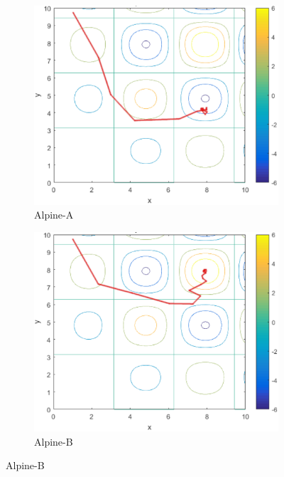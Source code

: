 \documentclass[conference]{IEEEtran}
\begin{document}
% 

\begin{figure}[!t]
\begin{subfigure}{.275\textwidth}
  \centering
  \includegraphics[width=.6\linewidth]{alpinea.png}
  \caption{Alpine-A}
  \label{fig:figur:7}
\end{subfigure}%
\begin{subfigure}{.275\textwidth}
  \centering
  \includegraphics[width=.6\linewidth]{alpineb.png}
  \caption{Alpine-B}
  \label{fig:figur:8}
\end{subfigure}

\end{figure}
\end{document}
